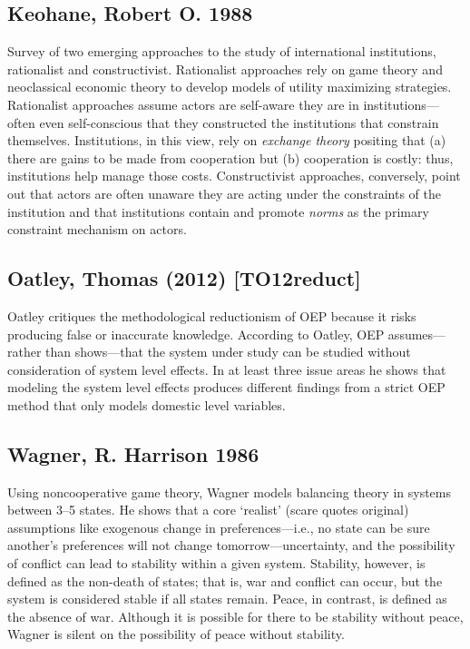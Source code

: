 \documentclass[11pt]{article}
\begin{document}
\subsection{Keohane, Robert O. 1988}
\label{sec-5-5}
Survey of two emerging approaches to the study of international
institutions, rationalist and constructivist. Rationalist approaches
rely on game theory and neoclassical economic theory to develop models
of utility maximizing strategies. Rationalist approaches assume actors
are self-aware they are in institutions---often even self-conscious
that they constructed the institutions that constrain
themselves. Institutions, in this view, rely on \emph{exchange theory}
positing that (a) there are gains to be made from cooperation but (b)
cooperation is costly: thus, institutions help manage those
costs. Constructivist approaches, conversely, point out that actors
are often unaware they are acting under the constraints of the
institution and that institutions contain and promote \emph{norms} as the
primary constraint mechanism on actors. 
\subsection{Oatley, Thomas (2012) [TO12reduct]}
\label{sec-5-6}
Oatley critiques the methodological reductionism of OEP because it
risks producing false or inaccurate knowledge. According to Oatley,
OEP assumes---rather than shows---that the system under study can be
studied without consideration of system level effects. In at least
three issue areas he shows that modeling the system level effects
produces different findings from a strict OEP method that only models
domestic level variables. 
\subsection{Wagner, R. Harrison 1986}
\label{sec-5-7}
Using noncooperative game theory, Wagner models balancing theory in
systems between 3--5 states. He shows that a core `realist' (scare
quotes original) assumptions like exogenous change in
preferences---i.e., no state can be sure another's preferences will
not change tomorrow---uncertainty, and the possibility of conflict can
lead to stability within a given system. Stability, however, is
defined as the non-death of states; that is, war and conflict can
occur, but the system is considered stable if all states
remain. Peace, in contrast, is defined as the absence of war. Although
it is possible for there to be stability without peace, Wagner is
silent on the possibility of peace without stability. 
\end{document}
